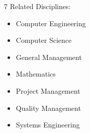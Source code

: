 \begin{minipage}{0.48\linewidth}
 7 Related Disciplines:
  \begin{itemize}
  \item Computer Engineering
  \item Computer Science
  \item General Management
  \item Mathematics
  \end{itemize}
\end{minipage}
\hfill
\begin{minipage}{0.48\linewidth}
  \begin{itemize}
  \item Project Management
  \item Quality Management
  \item Systems Engineering
  \end{itemize}
\end{minipage}
%
%
%
\newpage
